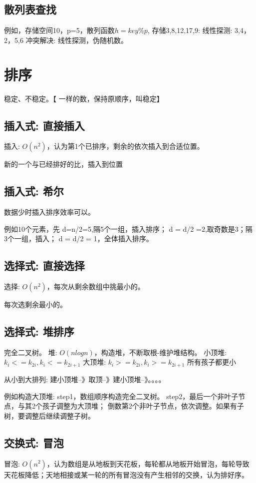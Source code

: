 \documentclass[UTF8]{../computerUniverse}
\begin{document}
\subsection{散列表查找}
例如，存储空间10，p=5，散列函数$h=key\%p$,
存储3,8,12,17,9: 线性探测:  3,4，2，5,6
冲突解决: 线性探测，伪随机数。



\section{排序}

稳定、不稳定。【 一样的数，保持原顺序，叫稳定】



\subsection{插入式: 直接插入}
插入: $O(n^2)$，认为第1个已排序，剩余的依次插入到合适位置。

新的一个与已经排好的比，插入到位置


\subsection{插入式: 希尔}
数据少时插入排序效率可以。

例如10个元素，先
d=n/2=5,隔5个一组，插入排序；
d = d/2  =2,取奇数是3；隔3个一组，插入；
d = d/2 = 1，全体插入排序。


\subsection{选择式: 直接选择}
选择: $O(n^2)$，每次从剩余数组中挑最小的。

每次选剩余最小的。


\subsection{选择式: 堆排序}
完全二叉树。
堆: $O(nlogn)$，构造堆，不断取根-维护堆结构。
小顶堆: $k_i<=k_{2i}, k_i<=k_{2i+1}$
大顶堆: $k_i>=k_{2i}, k_i>=k_{2i+1}$ 所有孩子都更小

从小到大排列: 建小顶堆--》取顶--》建小顶堆--》。。。。

例如构造大顶堆: 
step1，数组顺序构造完全二叉树。
step2，最后一个非叶子节点，与其2个孩子调整为大顶堆；
       倒数第2个非叶子节点，依次调整。如果有子树，要调整后继续调整子树。
       

\subsection{交换式: 冒泡}
冒泡: $O(n^2)$，认为数组是从地板到天花板，每轮都从地板开始冒泡，每轮导致天花板降低；天地相接或某一轮的所有冒泡没有产生相邻的交换，认为排好序。
\end{document}
